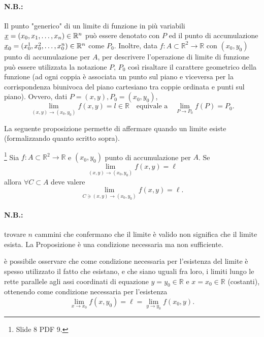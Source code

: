 \paragraph{N.B.:} Il punto "generico" di un limite di funzione in più variabili $\uline x=(x_0,x_1,\hdots, x_n)\in\mathbb R^n$ può essere denotato con $P$ ed il punto di accumulazione $\uline x_0=(x_0^1,x_0^2,\hdots, x_0^n)\in\mathbb R^n$ come $P_0$. Inoltre, data $f:A\subset\mathbb R^2\rightarrow\mathbb R$ con $(x_0,y_0)$ punto di accumulazione per $A$, per descrivere l'operazione di limite di funzione può essere utilizzata la notazione $P,\, P_0$ così risaltare il carattere geometrico della funzione (ad ogni coppia è associata un punto sul piano e viceversa per la corrispondenza biunivoca del piano cartesiano tra coppie ordinata e punti sul piano). Ovvero, dati $P=(x,y), P_0=(x_0,y_0)$,
\begin{equation*}
    \lim_{(x,y)\rightarrow(x_0,y_0)}f(x,y)=l\in\mathbb R \quad\text{equivale a}\quad \lim_{P\rightarrow P_0}f(P)=P_0.
\end{equation*}

La seguente proposizione permette di affermare quando un limite esiste (formalizzando quanto scritto sopra).

\begin{proposition}\footnote{Slide 8 PDF 9.}
    Sia $f\colon A\subset\mathbb R^2\rightarrow\mathbb R$ e $(x_0, y_0)$ punto di accumulazione per $A$. Se
    \begin{equation*}
        \lim_{(x,y)\rightarrow(x_0,y_0)} f(x,y)=\ell
    \end{equation*}
    allora $\forall C\subset A$ deve valere
    \begin{equation*}
        \lim_{C\ni(x,y)\rightarrow (x_0,y_0)}f(x, y)=\ell.
    \end{equation*}
\end{proposition}

\paragraph{N.B.:} trovare $n$ cammini che confermano che il limite è valido non significa che il limite esista. La Proposizione è una condizione necessaria ma non sufficiente.

\begin{remark}
    è possibile osservare che come condizione necessaria per l'esistenza del limite è spesso utilizzato il fatto che esistano, e che siano uguali fra loro, i limiti lungo le rette parallele agli assi coordinati di equazione $y=y_0\in\mathbb R$ e $x=x_0\in\mathbb R$ (costanti), ottenendo come condizione necessaria per l'esistenza
    \begin{equation*}
        \lim_{x\rightarrow x_0}f(x,y_0)=\ell=\lim_{y\rightarrow y_0}f(x_0, y).
    \end{equation*}
\end{remark}

